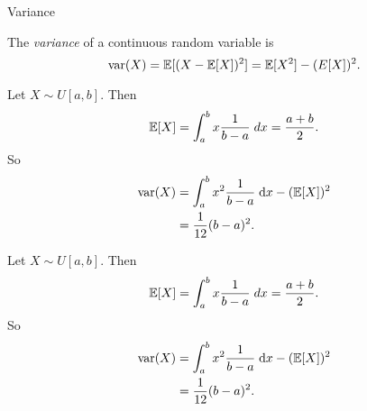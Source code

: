 %
\begin{note}
  \begin{field}
    Variance
  \end{field}
  \begin{field}
    \begin{defi}[Variance]
      The \emph{variance} of a continuous random variable is
      \[
        \operatorname{var} (X) = \mathbb{E}[(X - \mathbb{E}[X])^2] = \mathbb{E}[X^2] - (E[X])^2.
      \]
    \end{defi}
  \end{field}
  \xplain{}%
\end{note}

\begin{note}
  \begin{field}
    \begin{eg}
      Let $X\sim U[a, b]$. Then
      \[
        \mathbb{E}[X] = \int_a^b x\frac{1}{b - a}\;d x = \frac{a + b}{2}.
      \]
      So
      \begin{align*}
        \operatorname{var} (X) &= \int_a^b x^2\frac{1}{b - a}\;\mathrm{d} x - (\mathbb{E}[X])^2\\
        &= \frac{1}{12}(b - a)^2.
      \end{align*}
    \end{eg}
  \end{field}
  \begin{field}
    \begin{eg}
      Let $X\sim U[a, b]$. Then
      \[
        \mathbb{E}[X] = \int_a^b x\frac{1}{b - a}\;d x = \frac{a + b}{2}.
      \]
      So
      \begin{align*}
        \operatorname{var} (X) &= \int_a^b x^2\frac{1}{b - a}\;\mathrm{d} x - (\mathbb{E}[X])^2\\
        &= \frac{1}{12}(b - a)^2.
      \end{align*}
    \end{eg}
  \end{field}
  \xplain{}%
\end{note}

